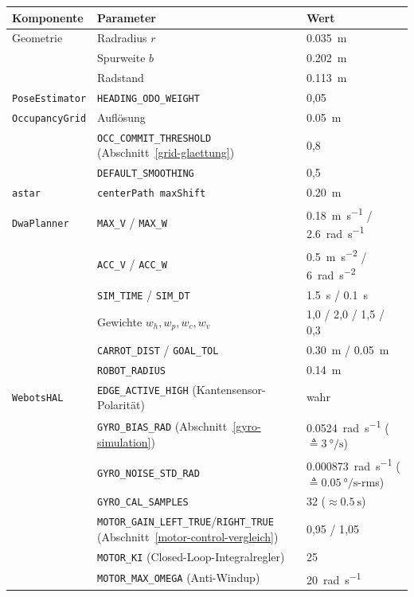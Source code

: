 \documentclass[
  a4paper,
  12pt,
  DIV=12,        %
  parskip=half,  %
  headings=small %
]{scrartcl}
\theoremstyle{definition}
\theoremstyle{definition}
\begin{document}
\begin{longtable}[]{@{}p{}p{}p{}@{}}
\toprule
\textbf{Komponente} & \textbf{Parameter} & \textbf{Wert}\\
\midrule
\endhead
Geometrie & Radradius $r$ & \SI{0.035}{\meter}\\
 & Spurweite $b$ & \SI{0.202}{\meter}\\
 & Radstand & \SI{0.113}{\meter}\\
\texttt{PoseEstimator} & \texttt{HEADING\_ODO\_WEIGHT} & 0{,}05\\
\texttt{OccupancyGrid} & Auflösung & \SI{0.05}{\meter}\\
 & \texttt{OCC\_COMMIT\_THRESHOLD} (Abschnitt~\ref{grid-glaettung}) & 0{,}8\\
 & \texttt{DEFAULT\_SMOOTHING} & 0{,}5\\
\texttt{astar} & \texttt{centerPath maxShift} & \SI{0.20}{\meter}\\
\texttt{DwaPlanner} & \texttt{MAX\_V} / \texttt{MAX\_W} & \SI{0.18}{\meter\per\second} / \SI{2.6}{\radian\per\second}\\
 & \texttt{ACC\_V} / \texttt{ACC\_W} & \SI{0.5}{\meter\per\second\squared} / \SI{6}{\radian\per\second\squared}\\
 & \texttt{SIM\_TIME} / \texttt{SIM\_DT} & \SI{1.5}{\second} / \SI{0.1}{\second}\\
 & Gewichte $w_h,w_p,w_c,w_v$ & 1{,}0 / 2{,}0 / 1{,}5 / 0{,}3\\
 & \texttt{CARROT\_DIST} / \texttt{GOAL\_TOL} & \SI{0.30}{\meter} / \SI{0.05}{\meter}\\
 & \texttt{ROBOT\_RADIUS} & \SI{0.14}{\meter}\\
\texttt{WebotsHAL} & \texttt{EDGE\_ACTIVE\_HIGH} (Kantensensor-Polarität) & wahr\\
 & \texttt{GYRO\_BIAS\_RAD} (Abschnitt~\ref{gyro-simulation}) & \SI{0.0524}{\radian\per\second} ($\triangleq\SI{3}{\degree\per\second}$)\\
 & \texttt{GYRO\_NOISE\_STD\_RAD} & \SI{0.000873}{\radian\per\second} ($\triangleq\SI{0.05}{\degree\per\second}$-rms)\\
 & \texttt{GYRO\_CAL\_SAMPLES} & 32 ($\approx\SI{0.5}{\second}$)\\
 & \small\texttt{MOTOR\_GAIN\_LEFT\_TRUE}/\texttt{RIGHT\_TRUE} (Abschnitt~\ref{motor-control-vergleich}) & 0{,}95 / 1{,}05\\
 & \texttt{MOTOR\_KI} (Closed-Loop-Integralregler) & 25\\
 & \texttt{MOTOR\_MAX\_OMEGA} (Anti-Windup) & \SI{20}{\radian\per\second}\\

\end{longtable}
\end{document}
